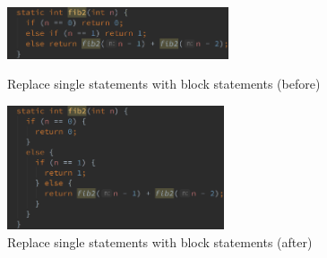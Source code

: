 \begin{figure}[htb]
    \centering
    \begin{minipage}[b]{0.45\textwidth}
        \centering
        \includegraphics[height=0.6in]{src/img/replace-single-statements-with-block-statements-before.png}
        \caption{Replace single statements with block statements (before)\label{img:replace-single-statements-with-block-statements-before}}
    \end{minipage}
    \hfill
    \begin{minipage}[b]{0.45\textwidth}
        \centering
        \includegraphics[height=1.44in]{src/img/replace-single-statements-with-block-statements-after.png}
        \caption{Replace single statements with block statements (after)\label{img:replace-single-statements-with-block-statements-after}}
    \end{minipage}
\end{figure}